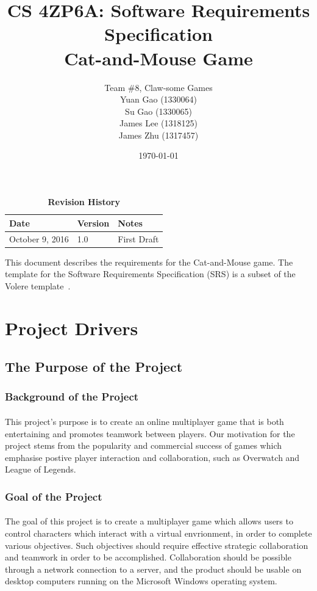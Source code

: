 \documentclass[12pt, titlepage]{article}
\title{CS 4ZP6A: Software Requirements Specification\\Cat-and-Mouse Game}
\author{Team \#8, Claw-some Games
		\\ Yuan Gao (1330064)
		\\ Su Gao (1330065)
		\\ James Lee (1318125)
		\\ James Zhu (1317457) 
}
\date{\today}
\begin{document}
\maketitle
{}
\tableofcontents
\listoftables
\listoffigures
\newcommand{\printBusinessEvent}{
    \stepcounter{BusinessEventList}
    \arabic{BusinessEventList}.
}

\begin{table}[bp]
\caption{\bf Revision History}
\begin{tabularx}{\textwidth}{p{3cm}p{2cm}X}
\toprule {\bf Date} & {\bf Version} & {\bf Notes}\\
\midrule
October 9, 2016 & 1.0 & First Draft\\
\bottomrule
\end{tabularx}
\end{table}
\newpage
{}
This document describes the requirements for the Cat-and-Mouse game. The template for the Software
Requirements Specification (SRS) is a subset of the Volere
template~\citep{RobertsonAndRobertson2012}. 
\section{Project Drivers}
\subsection{The Purpose of the Project}
\subsubsection{Background of the Project}
\paragraph{}This project's purpose is to create an online multiplayer game that is both entertaining and promotes teamwork between players. Our motivation for the project stems from the popularity and commercial success of games which emphasise postive player interaction and collaboration, such as Overwatch and League of Legends.
\subsubsection{Goal of the Project}
\paragraph{}The goal of this project is to create a  multiplayer game which allows users to control characters which interact with a virtual envrionment, in order to complete various objectives. Such objectives should require effective strategic collaboration and teamwork in order to be accomplished.  Collaboration should be possible through a network connection to a server, and the product should be usable on desktop computers running on the Microsoft Windows operating system.
\end{document}
